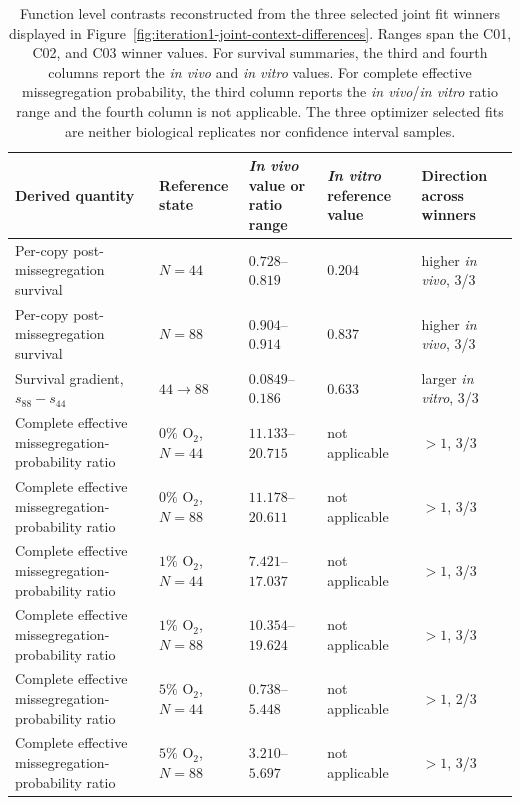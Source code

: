 \begin{table}[!htbp]
\centering
\small
\setlength{\tabcolsep}{4pt}
\caption{Function level contrasts reconstructed from the three selected joint fit winners displayed in Figure~\ref{fig:iteration1-joint-context-differences}. Ranges span the C01, C02, and C03 winner values. For survival summaries, the third and fourth columns report the \textit{in vivo} and \textit{in vitro} values. For complete effective missegregation probability, the third column reports the \textit{in vivo}/\textit{in vitro} ratio range and the fourth column is not applicable. The three optimizer selected fits are neither biological replicates nor confidence interval samples.}
\label{tab:joint_function_contrasts}
\begin{tabular}{@{}p{}p{}p{}p{}p{}@{}}
\toprule
Derived quantity & Reference state & \textit{In vivo} value or ratio range & \textit{In vitro} reference value & Direction across winners \\
\midrule
Per-copy post-missegregation survival & $N=44$ & $0.728$--$0.819$ & $0.204$ & higher \textit{in vivo}, 3/3 \\
Per-copy post-missegregation survival & $N=88$ & $0.904$--$0.914$ & $0.837$ & higher \textit{in vivo}, 3/3 \\
Survival gradient, $s_{88}-s_{44}$ & $44\rightarrow88$ & $0.0849$--$0.186$ & $0.633$ & larger \textit{in vitro}, 3/3 \\
\midrule
Complete effective missegregation-probability ratio & $0\%$ O$_2$, $N=44$ & $11.133$--$20.715$ & not applicable & $>1$, 3/3 \\
Complete effective missegregation-probability ratio & $0\%$ O$_2$, $N=88$ & $11.178$--$20.611$ & not applicable & $>1$, 3/3 \\
Complete effective missegregation-probability ratio & $1\%$ O$_2$, $N=44$ & $7.421$--$17.037$ & not applicable & $>1$, 3/3 \\
Complete effective missegregation-probability ratio & $1\%$ O$_2$, $N=88$ & $10.354$--$19.624$ & not applicable & $>1$, 3/3 \\
Complete effective missegregation-probability ratio & $5\%$ O$_2$, $N=44$ & $0.738$--$5.448$ & not applicable & $>1$, 2/3 \\
Complete effective missegregation-probability ratio & $5\%$ O$_2$, $N=88$ & $3.210$--$5.697$ & not applicable & $>1$, 3/3 \\
\bottomrule
\end{tabular}
\end{table}

